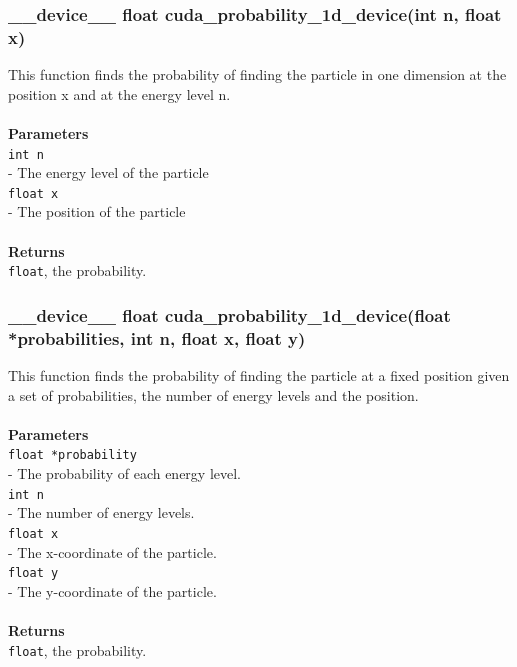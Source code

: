 \documentclass[a4paper, 10pt]{article}
\def\mar{\hspace*{5mm}}
\begin{document}
        \subsubsection{\_\_device\_\_ float cuda\_probability\_1d\_device(int n, float x)}
        This function finds the probability of finding the particle in one dimension 
        at the position x and at the energy level n.\\
        \\{\bf Parameters}\\
        \verb|int n|\\\mar- The energy level of the particle\\
        \verb|float x|\\\mar- The position of the particle\\
        \\{\bf Returns}\\
        \verb|float|, the probability.

        \vspace{1cm}
        \subsubsection{\_\_device\_\_ float cuda\_probability\_1d\_device(float *probabilities,
        int n, float x, float y)}
        This function finds the probability of finding the particle at a fixed position
        given a set of probabilities, the number of energy levels and the position.\\
        \\{\bf Parameters}\\
        \verb|float *probability|\\\mar- The probability of each energy level.\\
        \verb|int n|\\\mar- The number of energy levels.\\
        \verb|float x|\\\mar- The x-coordinate of the particle.\\
        \verb|float y|\\\mar- The y-coordinate of the particle.\\
        \\{\bf Returns}\\
        \verb|float|, the probability.

        \vspace{1cm}
\end{document}
